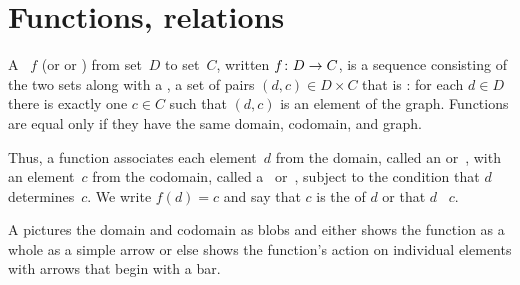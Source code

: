 \documentclass{test}  %
\begin{document}
\begin{problem}
\end{problem}











\chapter{Functions, relations}
\begin{df}
A ~$f$ (or  or ) 
from  set~$D$
to  set~$C$, written $\mbox{$f\colon D\to C$}$,
is a sequence consisting of the two sets along with a , 
a set of pairs $(d,c)\in D\times C$ that is 
: for each $d\in D$ there is
exactly one $c\in C$ such that $(d,c)$ is an element of the graph. 
Functions are equal only if they have the same domain, codomain,
and graph.
\end{df}

\noindent Thus, a function associates each element~$d$ from the domain,
called an  or~,
with an element~$c$ from the codomain, 
called a~ or~,
subject to the condition that $d$ determines~$c$. 
We write $f(d)=c$ and say that $c$ is the  of $d$ 
or that $d$ ~$c$.

A  pictures the domain and 
codomain as blobs and 
either shows the function as a whole as a simple arrow   
or else shows the function's action on individual elements 
with arrows that begin with a bar.
\begin{center}
  \hspace{8em}
\end{center}
\end{document}
